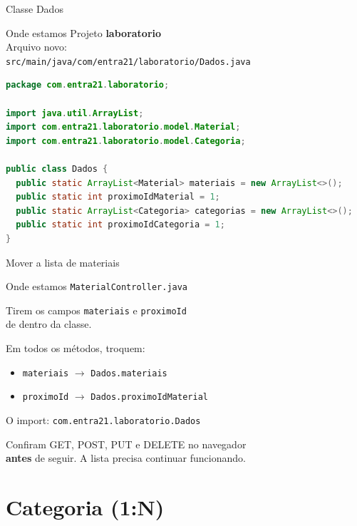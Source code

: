 \documentclass[aspectratio=169,11pt]{beamer}
\newcommand{\onde}[1]{%
  \begin{block}{Onde estamos}
    #1
  \end{block}
}
\begin{document}
\begin{frame}[fragile]{Classe Dados}
  \onde{Projeto \textbf{laboratorio}\\
        Arquivo novo:\\
        \texttt{src/main/java/com/entra21/laboratorio/Dados.java}}

\begin{lstlisting}[language=Java,basicstyle=\ttfamily\scriptsize]
package com.entra21.laboratorio;

import java.util.ArrayList;
import com.entra21.laboratorio.model.Material;
import com.entra21.laboratorio.model.Categoria;

public class Dados {
  public static ArrayList<Material> materiais = new ArrayList<>();
  public static int proximoIdMaterial = 1;
  public static ArrayList<Categoria> categorias = new ArrayList<>();
  public static int proximoIdCategoria = 1;
}
\end{lstlisting}
\end{frame}

\begin{frame}[fragile]{Mover a lista de materiais}
  \onde{\texttt{MaterialController.java}}

  Tirem os campos \texttt{materiais} e \texttt{proximoId}\\
  de dentro da classe.

  \vspace{0.4em}
  Em todos os métodos, troquem:
  \begin{itemize}
    \item \texttt{materiais} $\rightarrow$ \texttt{Dados.materiais}
    \item \texttt{proximoId} $\rightarrow$ \texttt{Dados.proximoIdMaterial}
  \end{itemize}

  \vspace{0.4em}
  O import:
  \texttt{com.entra21.laboratorio.Dados}

  \vspace{0.4em}
  Confiram GET, POST, PUT e DELETE no navegador\\
  \textbf{antes} de seguir. A lista precisa continuar funcionando.
\end{frame}

\section{Categoria (1{:}N)}
\end{document}
